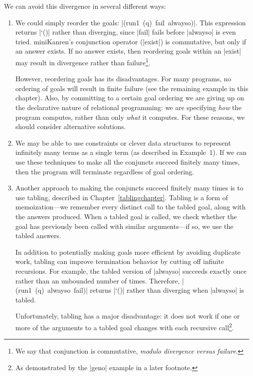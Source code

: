 We can avoid this divergence in several different ways:

\begin{enumerate}

\item We could simply reorder the goals: \mbox{\scheme|(run1 (q) fail alwayso)|}.
This expression returns \mbox{\schemeresult|`()|} rather
than diverging, since \scheme|fail| fails before \scheme|alwayso| is
even tried.  miniKanren's conjunction operator (\scheme|exist|) is
commutative, but only if an answer exists.  If no answer exists, then
reordering goals within an \scheme|exist| may result in divergence
rather than failure\footnote{We say that conjunction is commutative,
  \emph{modulo divergence versus failure}.}.

However, reordering goals has its disadvantages.  For many programs,
no ordering of goals will result in finite failure (see the remaining
example in this chapter).  Also, by committing to a certain goal
ordering we are giving up on the declarative nature of relational
programming: we are specifying \emph{how} the program computes, rather
than only \emph{what} it computes.  For these reasons, we should
consider alternative solutions.

\item We may be able to use constraints or clever data structures to
represent infinitely many terms as a single term (as described in
Example~1).  If we can use these techniques to make all the conjuncts
succeed finitely many times, then the program will terminate
regardless of goal ordering.

\item Another approach to making the conjuncts succeed finitely many
times is to use tabling, described in Chapter~\ref{tablingchapter}.
Tabling is a form of memoization---we remember every distinct call to
the tabled goal, along with the answers produced.  When a tabled goal
is called, we check whether the goal has previously been called with
similar arguments---if so, we use the tabled answers.

In addition to potentially making goals more efficient by avoiding
duplicate work, tabling can improve termination behavior by cutting
off infinite recursions.  For example, the tabled version of
\scheme|alwayso| succeeds exactly once rather than an unbounded number
of times.  Therefore, \mbox{\scheme|(run1 (q) alwayso fail)|}
returns \mbox{\schemeresult|`()|} rather than diverging when
\scheme|alwayso| is tabled.

Unfortunately, tabling has a major disadvantage: it does not work if
one or more of the arguments to a tabled goal changes with each
recursive call\footnote{As demonstrated by the \scheme|geno| example
in a later footnote.}.


\end{enumerate}
